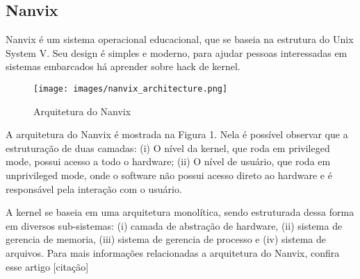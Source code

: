 \subsection{Nanvix}

Nanvix é um sistema operacional educacional, que se baseia na estrutura do Unix System V. Seu design é simples e moderno, 
para ajudar pessoas interessadas em sistemas embarcados há aprender sobre hack de kernel. 

\begin{figure}[h!]
    \centering
    \texttt{[image: images/nanvix\_architecture.png]}
    \caption{Arquitetura do Nanvix \\ \cite{ArquiteturaNanvix}} %
\end{figure}

A arquitetura do Nanvix é mostrada na Figura 1. Nela é possível observar que a estruturação de duas camadas: (i) O nível da kernel, 
que roda em privileged mode, possui acesso a todo o hardware; (ii) O nível de usuário, que roda em unprivileged mode, onde o software 
não possui acesso direto ao hardware e é responsável pela interação com o usuário. 

A kernel se baseia em uma arquitetura monolítica, sendo estruturada dessa forma em diversos sub-sistemas: (i) camada de abstração de hardware, 
(ii) sistema de gerencia de memoria, (iii) sistema de gerencia de processo e (iv) sistema de arquivos. Para mais informações relacionadas a arquitetura 
do Nanvix, confira esse artigo [citação]